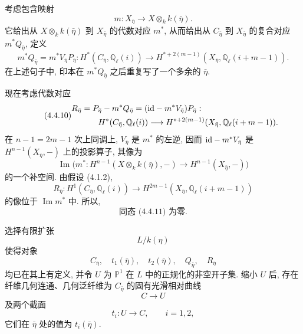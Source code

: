 考虑包含映射
\begin{equation*}
m:X_{\bar\eta}\longrightarrow X\otimes_k k(\bar\eta).
\end{equation*}
它给出从 $X\otimes_k k(\bar\eta)$ 到 $X_{\bar\eta}$ 的代数对应 $m^*$, 从而给出从 $C_{\bar\eta}$ 到 $X_{\bar\eta}$ 的复合对应 $m^*Q_{\bar\eta}$, 定义
\begin{equation}\tag{4.4.9}
m^*Q_{\bar\eta}=m^*V_{\bar\eta}P_{\bar\eta}:
H^*(C_{\bar\eta},\mathbb Q_\ell(i))
\longrightarrow
H^{*+2(m-1)}(X_{\bar\eta},\mathbb Q_\ell(i+m-1)).
\end{equation}
在上述句子中, 印本在 $m^*Q_{\bar\eta}$ 之后重复写了一个多余的 $\bar\eta$.

现在考虑代数对应
\begin{equation}\tag{4.4.10}
\begin{split}
R_{\bar\eta}
&=P_{\bar\eta}-m^*Q_{\bar\eta}
=(\mathrm{id}-m^*V_{\bar\eta})P_{\bar\eta}:\\
&\hspace{2em}H^*(C_{\bar\eta},\mathbb Q_\ell(i))
\longrightarrow
H^{*+2(m-1)}(X_{\bar\eta},\mathbb Q_\ell(i+m-1)).
\end{split}
\end{equation}
在 $n-1=2m-1$ 次上同调上, $V_{\bar\eta}$ 是 $m^*$ 的左逆, 因而 $\mathrm{id}-m^*V_{\bar\eta}$ 是 $H^{n-1}(X_{\bar\eta},-)$ 上的投影算子, 其像为
\begin{equation*}
\operatorname{Im}\bigl(m^*:H^{n-1}(X\otimes_k k(\bar\eta),-)
\longrightarrow H^{n-1}(X_{\bar\eta},-)\bigr)
\end{equation*}
的一个补空间. 由假设 (4.1.2),
\begin{equation}\tag{4.4.11}
R_{\bar\eta}:H^1(C_{\bar\eta},\mathbb Q_\ell(i))
\longrightarrow
H^{2m-1}(X_{\bar\eta},\mathbb Q_\ell(i+m-1))
\end{equation}
的像位于 $\operatorname{Im}m^*$ 中. 所以,
\begin{equation}\tag{4.4.12}
\text{同态 (4.4.11) 为零.}
\end{equation}

选择有限扩张
\begin{equation*}
L/k(\eta)
\end{equation*}
使得对象
\begin{equation*}
C_{\bar\eta},\quad t_1(\bar\eta),\quad t_2(\bar\eta),\quad
Q_{\bar\eta},\quad R_{\bar\eta}
\end{equation*}
均已在其上有定义, 并令 $U$ 为 $\mathbb P^1$ 在 $L$ 中的正规化的非空开子集. 缩小 $U$ 后, 存在纤维几何连通、几何泛纤维为 $C_{\bar\eta}$ 的固有光滑相对曲线
\begin{equation*}
C\longrightarrow U
\end{equation*}
及两个截面
\begin{equation*}
t_i:U\longrightarrow C,\qquad i=1,2,
\end{equation*}
它们在 $\bar\eta$ 处的值为 $t_i(\bar\eta)$.

